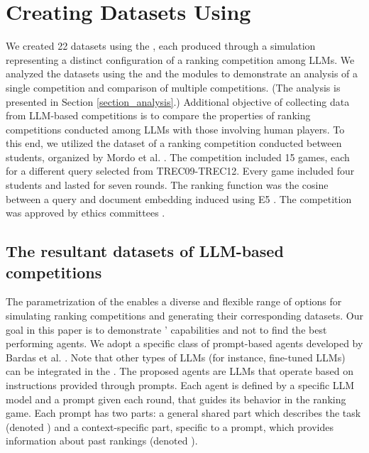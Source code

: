 \section{Creating Datasets Using \platformName}\label{section_data}

We created 22 datasets using the {\platformName} {\platform}, each produced through a simulation representing a distinct configuration of a ranking competition among LLMs.
We analyzed the datasets using the {\platformName} {\analyzer} and the {\platformName} {\compare} modules to demonstrate an analysis of a single competition and comparison of multiple competitions. (The analysis is presented in Section \ref{section_analysis}.)
Additional objective of collecting data from LLM-based competitions is to compare the properties of ranking competitions conducted among LLMs with those involving human players. To this end, we utilized the dataset of a ranking competition conducted between students, organized by Mordo et al. \cite{mordo_search_2025}. The competition included 15 games, each for a different query selected from TREC09-TREC12. Every game included four students and lasted for seven rounds. The ranking function was the cosine between a query and document embedding induced using E5 \cite{wang_text_2024}. The competition was approved by ethics committees \cite{mordo_search_2025}.



\subsection{The resultant datasets of LLM-based competitions}
The parametrization of the {\platformName} {\platform} enables a diverse and flexible range of options for simulating ranking competitions and generating their corresponding datasets. Our goal in this paper is to demonstrate {\platformName}' capabilities and not to find the best performing agents. We adopt a specific class of prompt-based agents developed by Bardas et al. \cite{bardas_prompt-based_2025}. Note that other types of LLMs (for instance, fine-tuned LLMs) can be integrated in the {\platformName} {\platform}. The proposed agents are LLMs that operate based on instructions provided through prompts. Each agent is defined by a specific LLM model and a prompt given each round, that guides its behavior in the ranking game. Each prompt has two parts: a general shared part which describes the task (denoted \textit{\shared}) and a context-specific part, specific to a prompt, which provides information about past rankings (denoted \textit{\contextualized}).

